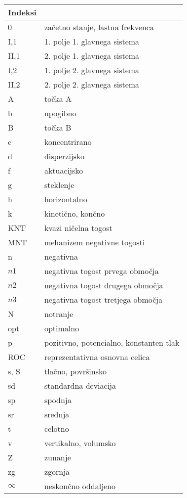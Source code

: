 \newpage
\begin{longtable}[l]{@{}p{}@{}p{}@{}}
\hline
Indeksi & \\
\hline
\endfirsthead
\hline
\endhead
    0 & začetno stanje, lastna frekvenca \\
    I,1 & 1. polje 1. glavnega sistema\\
    II,1 & 2. polje 1. glavnega sistema\\
    I,2 & 1. polje 2. glavnega sistema\\
    II,2 & 2. polje 2. glavnega sistema\\
    A & točka A\\
    b & upogibno \\
    B & točka B\\
    c & koncentrirano \\
    d & disperzijsko \\
    f & aktuacijsko \\
    g & steklenje \\
    h & horizontalno \\
    k & kinetično, končno \\
    KNT & kvazi ničelna togost \\
    MNT & mehanizem negativne togosti \\
    n & negativna\\
    $n1$ & negativna togost prvega območja \\
    $n2$ & negativna togost drugega območja \\
    $n3$ & negativna togost tretjega območja \\
    N & notranje \\
    opt & optimalno \\
    p & pozitivno, potencialno, konstanten tlak\\
    ROC & reprezentativna osnovna celica \\
    s, S & tlačno, površinsko \\
    sd & standardna deviacija \\
    sp & spodnja \\
    sr & srednja \\
    t & celotno \\
    v & vertikalno, volumsko \\
    Z & zunanje \\
    zg & zgornja \\
    $\infty$ & neskončno oddaljeno \\

\end{longtable}

